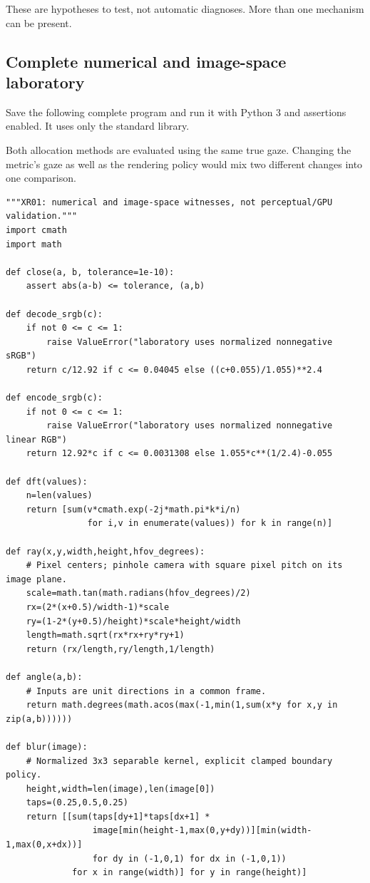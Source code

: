 These are hypotheses to test, not automatic diagnoses. More than one mechanism can be present.

\subsection{Complete numerical and image-space laboratory}\label{04-visual-computing-ii-ch043-complete-numerical-and-image-space-laboratory}

Save the following complete program and run it with Python 3 and assertions enabled. It uses only the standard library.

Both allocation methods are evaluated using the same true gaze. Changing the metric's gaze as well as the rendering policy would mix two different changes into one comparison.

\begin{verbatim}
"""XR01: numerical and image-space witnesses, not perceptual/GPU validation."""
import cmath
import math

def close(a, b, tolerance=1e-10):
    assert abs(a-b) <= tolerance, (a,b)

def decode_srgb(c):
    if not 0 <= c <= 1:
        raise ValueError("laboratory uses normalized nonnegative sRGB")
    return c/12.92 if c <= 0.04045 else ((c+0.055)/1.055)**2.4

def encode_srgb(c):
    if not 0 <= c <= 1:
        raise ValueError("laboratory uses normalized nonnegative linear RGB")
    return 12.92*c if c <= 0.0031308 else 1.055*c**(1/2.4)-0.055

def dft(values):
    n=len(values)
    return [sum(v*cmath.exp(-2j*math.pi*k*i/n)
                for i,v in enumerate(values)) for k in range(n)]

def ray(x,y,width,height,hfov_degrees):
    # Pixel centers; pinhole camera with square pixel pitch on its image plane.
    scale=math.tan(math.radians(hfov_degrees)/2)
    rx=(2*(x+0.5)/width-1)*scale
    ry=(1-2*(y+0.5)/height)*scale*height/width
    length=math.sqrt(rx*rx+ry*ry+1)
    return (rx/length,ry/length,1/length)

def angle(a,b):
    # Inputs are unit directions in a common frame.
    return math.degrees(math.acos(max(-1,min(1,sum(x*y for x,y in zip(a,b))))))

def blur(image):
    # Normalized 3x3 separable kernel, explicit clamped boundary policy.
    height,width=len(image),len(image[0])
    taps=(0.25,0.5,0.25)
    return [[sum(taps[dy+1]*taps[dx+1] *
                 image[min(height-1,max(0,y+dy))][min(width-1,max(0,x+dx))]
                 for dy in (-1,0,1) for dx in (-1,0,1))
             for x in range(width)] for y in range(height)]


\end{verbatim}
